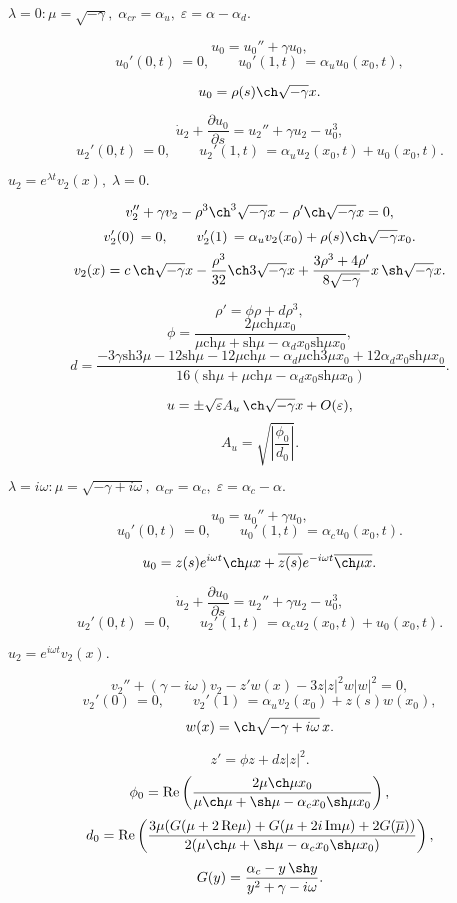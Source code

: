 \documentclass[12pt]{extarticle}
\begin{document}
$ \lambda = 0: \mu = \sqrt{-\gamma}, \; \alpha_{cr} = \alpha_u, \; \varepsilon=\alpha-\alpha_d. $

$$	u_0 = u_0'' + \gamma u_0, $$
$$	u_0'(0, t) \, = 0, \qquad u_0'(1, t) \, = \alpha_u u_0(x_0, t), $$

$$ u_0 = \rho(s) \ch \sqrt{-\gamma} x. $$

$$ \dot u_2 + \frac{\partial u_0}{\partial s} = u_2'' + \gamma u_2 - u_0^3, $$
$$ u_2'(0, t) \, = 0, \qquad u_2'(1, t) \, = \alpha_u u_2(x_0, t) + u_0(x_0, t). $$

$ u_2 = e^{\lambda t}v_2(x), \; \lambda = 0. $

$$	v_2'' + \gamma v_2 - \rho^3 \ch^3 \sqrt{-\gamma} x - \rho' \ch \sqrt{-\gamma} x = 0, $$
$$	v_2'(0) \, = 0, \qquad v_2'(1) \, = \alpha_u v_2(x_0) + \rho(s) \ch \sqrt{-\gamma} x_0. $$
$$ v_2(x) = c \, \ch \sqrt{-\gamma} x - \frac{\rho^3}{32} \ch 3\sqrt{-\gamma} x + \frac{3\rho^3 + 4\rho'}{8\sqrt{-\gamma}} x \, \sh \sqrt{-\gamma} x. $$

$$	\rho' = \phi \rho + d \rho^3, $$
$$ \phi = \frac{ 2 \mu \mbox{ch} \mu x_0 }{ \mu \mbox{ch} \mu +\mbox{sh} \mu - \alpha_d x_0 \mbox{sh} \mu x_0 }, $$
$$ d = \frac{ -3\gamma \mbox{sh} 3\mu - 12 \mbox{sh} \mu - 12 \mu \mbox{ch} \mu - \alpha_d \mu \mbox{ch} 3\mu x_0 + 12 \alpha_d x_0 \mbox{sh} \mu x_0 }{ 16( \mbox{sh} \mu + \mu \mbox{ch} \mu - \alpha_d x_0 \mbox{sh} \mu x_0 ) }. $$

$$ u = \pm \sqrt{ \varepsilon } A_u \, \ch \sqrt{-\gamma} x + O(\varepsilon), $$
$$ A_u = \sqrt{\left|\dfrac{\phi_0}{d_0}\right|}. $$

$ \lambda = i \omega: \mu = \sqrt{-\gamma + i \omega}, \; \alpha_{cr} = \alpha_c, \; \varepsilon=\alpha_c-\alpha. $

$$	u_0 = u_0'' + \gamma u_0, $$
$$	u_0'(0, t) \, = 0, \qquad u_0'(1, t) \, = \alpha_c u_0(x_0, t). $$

$$ u_0 = z(s) e^{i \omega t} \ch \mu x + \overline{z(s)} e^{-i \omega t} \overline{\ch \mu x}. $$

$$	\dot u_2 + \frac{\partial u_0}{\partial s} = u_2'' + \gamma u_2 - u_0^3, $$
$$	u_2'(0, t) \, = 0, \qquad u_2'(1, t) \, = \alpha_c u_2(x_0, t) + u_0(x_0, t). $$

$ u_2 = e^{i \omega t} v_2(x). $

$$	v_2'' + (\gamma - i \omega) v_2 - z' w(x) - 3z|z|^2 w|w|^2 = 0, $$
$$	v_2'(0) \, = 0, \qquad v_2'(1) \, = \alpha_u v_2(x_0) + z(s) w(x_0), $$
$$ w(x) = \ch \sqrt{-\gamma + i \omega} \, x. $$

$$	z' = \phi z + d z |z|^2. $$
$$ \phi_0 = \operatorname{Re} \left( \frac{ 2 \mu \ch \mu x_0 }{ \mu \ch \mu +\sh \mu - \alpha_c x_0 \sh \mu x_0 } \right), $$
$$ d_0 = \operatorname{Re} \left( \frac{ 3 \mu ( G(\mu + 2\,\mbox{Re}\mu) + G(\mu + 2i\,\mbox{Im}\mu) + 2G(\overline{\mu}) ) }{ 2 ( \mu \ch \mu +\sh \mu - \alpha_c x_0 \sh \mu x_0 ) } \right), $$
$$ G(y) = \frac{ \alpha_c - y\,\sh y }{ y^2 + \gamma - i\omega }. $$
\end{document}
